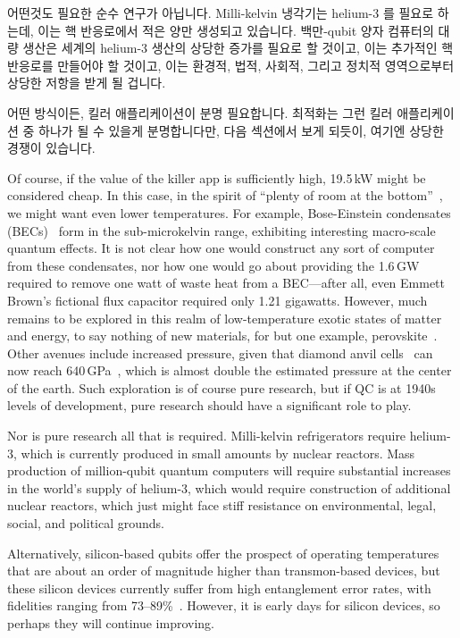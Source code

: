어떤것도 필요한 순수 연구가 아닙니다.
Milli-kelvin 냉각기는 helium-3 를 필요로 하는데, 이는 핵 반응로에서 적은 양만
생성되고 있습니다.
백만-qubit 양자 컴퓨터의 대량 생산은 세계의 helium-3 생산의 상당한 증가를
필요로 할 것이고, 이는 추가적인 핵 반응로를 만들어야 할 것이고, 이는 환경적,
법적, 사회적, 그리고 정치적 영역으로부터 상당한 저항을 받게 될 겁니다.

어떤 방식이든, 킬러 애플리케이션이 분명 필요합니다.
최적화는 그런 킬러 애플리케이션 중 하나가 될 수 있을게 분명합니다만, 다음
섹션에서 보게 되듯이, 여기엔 상당한 경쟁이 있습니다.
\iffalse

Of course, if the value of the killer app is sufficiently high,
19.5\,kW might be considered cheap.
In this case, in the spirit of
``plenty of room at the bottom''~\cite{RichardPFeynman1959RoomAtBottom},
we might want even lower temperatures.
For example, Bose-Einstein condensates
(BECs)~\cite{NIST2001BoseEinsteinCondensate}
form in the sub-microkelvin range, exhibiting interesting
macro-scale quantum effects.
It is not clear how one would construct any sort of computer from
these condensates, nor how one would go about providing the 1.6\,GW
required to remove one watt of waste heat from a BEC---after all,
even Emmett Brown's fictional flux capacitor required only 1.21 gigawatts.
However, much remains to be explored in this realm
of low-temperature exotic states of matter and energy, to say
nothing of new materials, for but one example,
perovskite~\cite{ZhengChen2016PerovskiteQDMOFthinFilm}.
Other avenues include increased pressure, given that diamond anvil
cells~\cite{Weir1959DiamondAnvilCell} can now reach
640\,GPa~\cite{LeonidDubrovinsky2012640GPaDiamondAnvilCell},
which is almost double the estimated pressure at the center of the earth.
Such exploration is of course pure research, but if QC is at 1940s levels
of development, pure research should have a significant role to play.

Nor is pure research all that is required.
Milli-kelvin refrigerators require helium-3, which is currently
produced in small amounts by nuclear reactors.
Mass production of million-qubit quantum computers will require
substantial increases in the world's supply of helium-3, which would
require construction of additional nuclear reactors, which just might face
stiff resistance on environmental, legal, social, and political grounds.

Alternatively, silicon-based qubits offer the prospect of
operating temperatures that are about an order of magnitude higher than
transmon-based devices, but these silicon devices currently suffer from
high entanglement error rates, with fidelities ranging from
73--89\%~\cite{TFWatson2017SiliconQubit}.
However, it is early days for silicon devices, so perhaps they will
continue improving.

